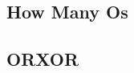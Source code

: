         \subsection{How Many Os}
                
%                 
        \subsection{ORXOR}
                
%                 
%                 
%                 

%                 
%                 

%                 


